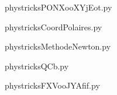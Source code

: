     

    \clearpage
    


    \newcommand{\CaptionFigPONXooXYjEot}{<+Type your caption here+>}
    \begin{center}
        
    \end{center}
    phystricksPONXooXYjEot.py

    

    \clearpage
    


    \newcommand{\CaptionFigCoordPolaires}{<+Type your caption here+>}
    \begin{center}
        
    \end{center}
    phystricksCoordPolaires.py

    

    \clearpage
    


    \newcommand{\CaptionFigMethodeNewton}{<+Type your caption here+>}
    \begin{center}
        
    \end{center}
    phystricksMethodeNewton.py

    

    \clearpage
    


    \newcommand{\CaptionFigQCb}{<+Type your caption here+>}
    \begin{center}
        
    \end{center}
    phystricksQCb.py

    

    \clearpage
    


    \newcommand{\CaptionFigFXVooJYAfif}{<+Type your caption here+>}
    \begin{center}
        
    \end{center}
    phystricksFXVooJYAfif.py

    

    \clearpage
    


